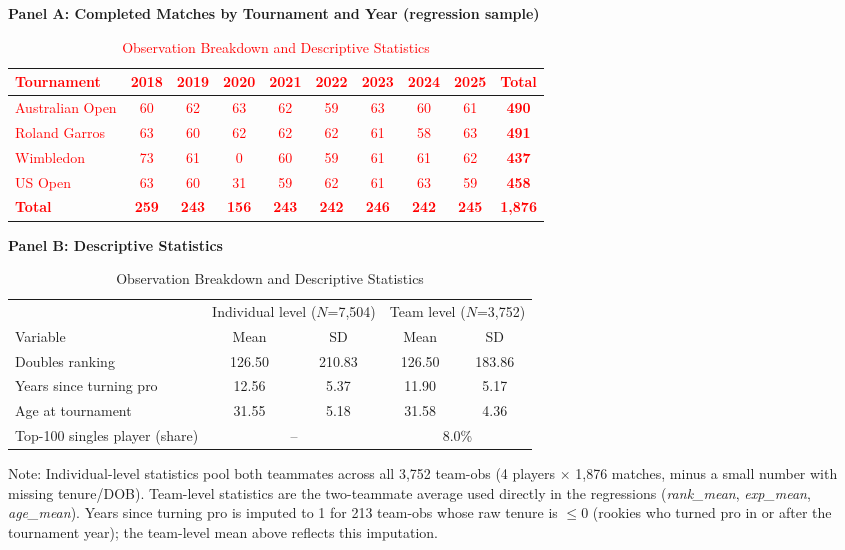 \documentclass[10pt]{article}
\begin{document}
\begin{table}[htbp]
\color{blue}
\centering
\caption{Observation Breakdown and Descriptive Statistics}
\label{tab:t1}
\begin{threeparttable}
\textbf{Panel A: Completed Matches by Tournament and Year (regression sample)}\\[2pt]
\textcolor{red}{
\begin{tabular}{lccccccccc}
\toprule
Tournament & 2018 & 2019 & 2020 & 2021 & 2022 & 2023 & 2024 & 2025 & \textbf{Total} \\
\midrule
Australian Open & 60 & 62 & 63 & 62 & 59 & 63 & 60 & 61 & \textbf{490} \\
Roland Garros    & 63 & 60 & 62 & 62 & 62 & 61 & 58 & 63 & \textbf{491} \\
Wimbledon        & 73 & 61 & 0  & 60 & 59 & 61 & 61 & 62 & \textbf{437} \\
US Open          & 63 & 60 & 31 & 59 & 62 & 61 & 63 & 59 & \textbf{458} \\
\midrule
\textbf{Total} & \textbf{259} & \textbf{243} & \textbf{156} & \textbf{243} & \textbf{242} & \textbf{246} & \textbf{242} & \textbf{245} & \textbf{1,876} \\
\bottomrule
\end{tabular}
}

\vspace{10pt}
\textbf{Panel B: Descriptive Statistics}\\[2pt]
\begin{tabular}{lcccc}
\toprule
 & \multicolumn{2}{c}{Individual level ($N$=7,504)} & \multicolumn{2}{c}{Team level ($N$=3,752)} \\
Variable & Mean & SD & Mean & SD \\
\midrule
Doubles ranking            & 126.50 & 210.83 & 126.50 & 183.86 \\
Years since turning pro    & 12.56  & 5.37   & 11.90  & 5.17   \\
Age at tournament          & 31.55  & 5.18   & 31.58  & 4.36   \\
Top-100 singles player (share) & \multicolumn{2}{c}{--} & \multicolumn{2}{c}{8.0\%} \\
\bottomrule
\end{tabular}
\begin{tablenotes}
\small
\item Note: Individual-level statistics pool both teammates across all 3,752 team-obs (4 players $\times$ 1,876 matches, minus a small number with missing tenure/DOB). Team-level statistics are the two-teammate average used directly in the regressions (\textit{rank\_mean}, \textit{exp\_mean}, \textit{age\_mean}). Years since turning pro is imputed to 1 for 213 team-obs whose raw tenure is $\le 0$ (rookies who turned pro in or after the tournament year); the team-level mean above reflects this imputation.
\end{tablenotes}
\end{threeparttable}
\end{table}
\end{document}
